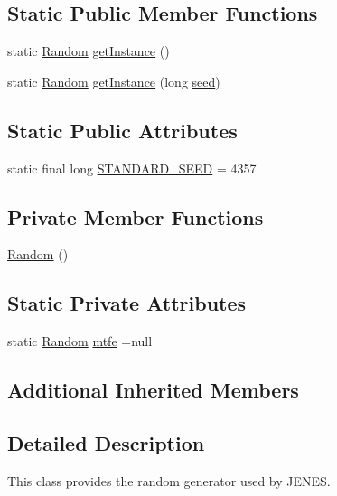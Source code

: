 \subsection*{Static Public Member Functions}
\begin{DoxyCompactItemize}
\item 
static \hyperlink{classjenes_1_1utils_1_1_random}{Random} \hyperlink{classjenes_1_1utils_1_1_random_aa8b8341f82ccf69de0b44c9f6f174820}{get\-Instance} ()
\item 
static \hyperlink{classjenes_1_1utils_1_1_random}{Random} \hyperlink{classjenes_1_1utils_1_1_random_a83dd69fffe081a48e58702c0f118b12e}{get\-Instance} (long \hyperlink{classjenes_1_1utils_1_1_mersenne_twister_fast_af54ad21e36a866d458e55ad8c3d89ac2}{seed})
\end{DoxyCompactItemize}
\subsection*{Static Public Attributes}
\begin{DoxyCompactItemize}
\item 
static final long \hyperlink{classjenes_1_1utils_1_1_random_aee05c4e6476472dc9dc02d2fd94061b5}{S\-T\-A\-N\-D\-A\-R\-D\-\_\-\-S\-E\-E\-D} = 4357
\end{DoxyCompactItemize}
\subsection*{Private Member Functions}
\begin{DoxyCompactItemize}
\item 
\hyperlink{classjenes_1_1utils_1_1_random_abc0a49a2ae768940772ae28962f5c71d}{Random} ()
\end{DoxyCompactItemize}
\subsection*{Static Private Attributes}
\begin{DoxyCompactItemize}
\item 
static \hyperlink{classjenes_1_1utils_1_1_random}{Random} \hyperlink{classjenes_1_1utils_1_1_random_a4d07f44b9a2f1bc18feb0059dd70b79a}{mtfe} =null
\end{DoxyCompactItemize}
\subsection*{Additional Inherited Members}


\subsection{Detailed Description}
This class provides the random generator used by J\-E\-N\-E\-S. 

